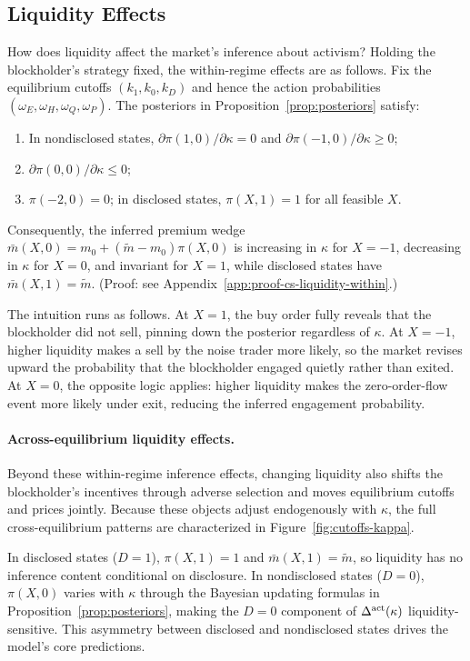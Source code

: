 \documentclass[11pt]{article}
\newcommand{\1}{\mathbf{1}}
\begin{document}
%
\subsection{Liquidity Effects}
%

How does liquidity affect the market's inference about activism? Holding the blockholder's strategy fixed, the within-regime effects are as follows. Fix the equilibrium cutoffs $(k_1,k_0,k_D)$ and hence the action probabilities $(\omega_E,\omega_H,\omega_Q,\omega_P)$. The posteriors in Proposition~\ref{prop:posteriors} satisfy:
\begin{enumerate}[label=\textup{(\alph*)},leftmargin=2em]
\item In nondisclosed states, $\partial \pi(1,0)/\partial \kappa = 0$ and $\partial \pi(-1,0)/\partial \kappa \ge 0$;
\item $\partial \pi(0,0)/\partial \kappa \le 0$;
\item $\pi(-2,0)=0$; in disclosed states, $\pi(X,1)=1$ for all feasible $X$.
\end{enumerate}
Consequently, the inferred premium wedge $\bar{m}(X,0)=m_0+(\tilde{m}-m_0)\pi(X,0)$ is increasing in $\kappa$ for $X=-1$, decreasing in $\kappa$ for $X=0$, and invariant for $X=1$, while disclosed states have $\bar{m}(X,1)=\tilde{m}$. (Proof: see Appendix~\ref{app:proof-cs-liquidity-within}.)

The intuition runs as follows. At $X=1$, the buy order fully reveals that the blockholder did not sell, pinning down the posterior regardless of $\kappa$. At $X=-1$, higher liquidity makes a sell by the noise trader more likely, so the market revises upward the probability that the blockholder engaged quietly rather than exited. At $X=0$, the opposite logic applies: higher liquidity makes the zero-order-flow event more likely under exit, reducing the inferred engagement probability.

\paragraph{Across-equilibrium liquidity effects.}
Beyond these within-regime inference effects, changing liquidity also shifts the blockholder's incentives through adverse selection and moves equilibrium cutoffs and prices jointly. Because these objects adjust endogenously with $\kappa$, the full cross-equilibrium patterns are characterized in Figure~\ref{fig:cutoffs-kappa}.

In disclosed states ($D=1$), $\pi(X,1)=1$ and $\bar{m}(X,1)=\tilde{m}$, so liquidity has no inference content conditional on disclosure. In nondisclosed states ($D=0$), $\pi(X,0)$ varies with $\kappa$ through the Bayesian updating formulas in Proposition~\ref{prop:posteriors}, making the $D=0$ component of $\Delta^{\textup{act}}(\kappa)$ liquidity-sensitive. This asymmetry between disclosed and nondisclosed states drives the model's core predictions.
\end{document}
